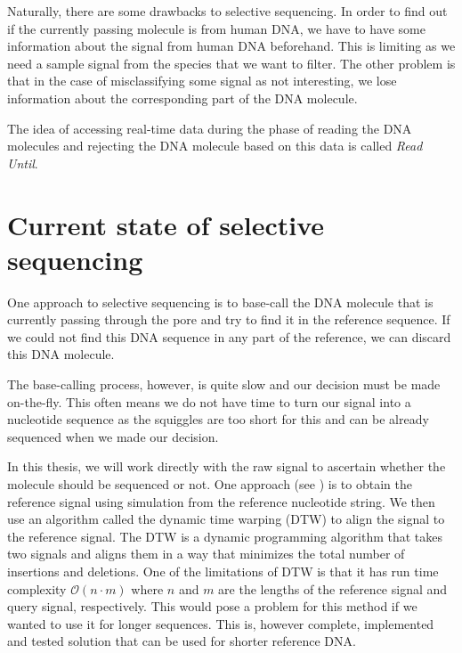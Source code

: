 Naturally, there are some drawbacks to selective sequencing. In order to find out
if the currently passing molecule is from human DNA, we have to have some information
about the signal from human DNA beforehand. This is limiting as we need a sample signal from
the species that we want to filter. The other problem is that in the case of misclassifying
some signal as not interesting, we lose information about the corresponding
part of the DNA molecule.

The idea of accessing real-time data during the phase of reading the DNA molecules
and rejecting the DNA molecule based on this data is called \textit{Read Until}. 

\section{Current state of selective sequencing}
\label{section:currState}


One approach to selective sequencing is to base-call the DNA molecule that is
currently passing through the pore and try to find it in the reference sequence.
If we could not find this DNA sequence in any part of the reference, we can discard this DNA molecule.

The base-calling process, however, is quite slow and our decision must be made on-the-fly.
This often means we do not have time to turn our signal into a nucleotide sequence
as the squiggles are too short for this and can be already sequenced when we made our decision.

In this thesis, we will work directly with the raw signal to ascertain whether the molecule
should be sequenced or not. One approach (see \cite{loose2016real}) is to obtain the reference signal using
simulation from the reference nucleotide string. We then use an algorithm called
the dynamic time warping (DTW) to align the signal to the reference signal.
The DTW is a dynamic programming algorithm that takes two signals and aligns them in a
way that minimizes the total number of insertions and deletions. One of the limitations
of DTW is that it has run time complexity $\mathcal{O}(n\cdot m)$ where $n$ and $m$
are the lengths of the reference signal and query signal, respectively. This would pose a problem
for this method if we wanted to use it for longer sequences. This is, however complete,
implemented and tested solution that can be used for shorter reference DNA.

